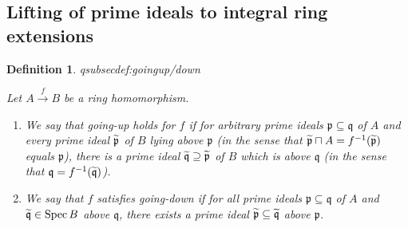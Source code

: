 \documentclass[DIV=14,parskip=full,pointednumbers]{scrartcl}
\newenvironment{alphanumerate}{\begin{enumerate}[label={$(\alph*)$},ref=\curthm]}{\end{enumerate}}
\theoremstyle{cthm}
\theoremstyle{cvarthm}
\theoremstyle{cdef}
\newtheorem{defi}{Definition}[subsection]
\newcommand{\lbl}[1]{
	\label{#1}
	\ifmmode
	\expandafter\xdef\csname eqsubsec#1\endcsname{\thesubsection}
	\fi
}
\newcommand{\pp}{\mathfrak{p}}
\newcommand{\qq}{\mathfrak{q}}
\newcommand{\Spec}{\operatorname{Spec}}
\newcommand{\longto}{\longrightarrow}
\newcommand{\snake}[1]{\widetilde{#1}\vphantom{\overrightarrow{#1}}}%
\newcommand{\morphism}[1][]{\overset{#1}{\longto}}
\begin{document}
\subsection{Lifting of prime ideals to integral ring extensions}
	\begin{defi}\lbl{def:goingup/down}
		Let $A\morphism[f]B$ be a ring homomorphism.
		\begin{alphanumerate}
			\item We say that \emph{going-up} holds for $f$ if for arbitrary prime ideals $\pp\subseteq \qq$ of $A$ and every prime ideal $\snake \pp$ of $B$ lying \emph{above} $\pp$ (in the sense that $\snake\pp\sqcap A=f^{-1}(\snake \pp)$ equals $\pp$), there is a prime ideal $\snake \qq\supseteq\snake \pp$ of $B$ which is above $\qq$ (in the sense that $\qq=f^{-1}(\snake\qq)$).
			\item We say that $f$ satisfies \emph{going-down} if for all prime ideals $\pp\subseteq\qq$ of $A$ and $\snake \qq\in\Spec B$ above $\qq$, there exists a prime ideal $\snake \pp\subseteq\snake\qq$ above $\pp$.
		\end{alphanumerate}
	\end{defi}
\end{document}
